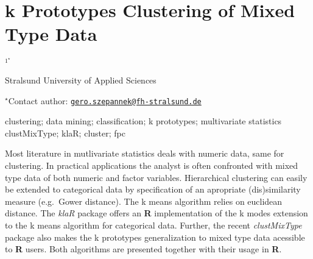 \documentclass[\main/boa.tex]{subfiles}
\begin{document}
\section{k Prototypes Clustering of Mixed Type Data}

\begin{center}
  {\bf {}$^{1^\star}$}
\end{center}

\vskip 0.3cm

\begin{affiliations}
\begin{enumerate}
\begin{minipage}{0.915\textwidth}
\centering
\item Stralsund University of Applied Sciences \\[-2pt]
\end{minipage}
\end{enumerate}
$^\star$Contact author: \href{mailto:gero.szepannek@fh-stralsund.de}{\nolinkurl{gero.szepannek@fh-stralsund.de}}\\
\end{affiliations}

\vskip 0.5cm

\begin{minipage}{0.915\textwidth}
\keywords clustering; data mining; classification; k prototypes; multivariate
statistics
\packages clustMixType; klaR; cluster; fpc
\end{minipage}

\vskip 0.8cm

Most literature in mutlivariate statistics deals with numeric data, same
for clustering. In practical applications the analyst is often
confronted with mixed type data of both numeric and factor variables.
Hierarchical clustering can easily be extended to categorical data by
specification of an apropriate (dis)similarity measure (e.g.~Gower
distance). The k means algorithm relies on euclidean distance. The
\emph{klaR} package offers an \textbf{R} implementation of the k modes
extension to the k means algorithm for categorical data. Further, the
recent \emph{clustMixType} package also makes the k prototypes
generalization to mixed type data acessible to \textbf{R} users. Both
algorithms are presented together with their usage in \textbf{R}.
\end{document}
